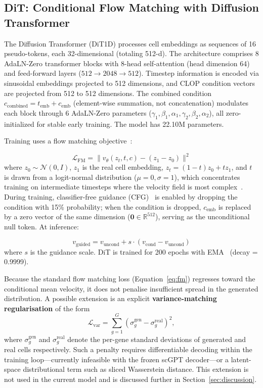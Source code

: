 \documentclass[preprint,12pt]{elsarticle}
\begin{document}
\subsection{DiT: Conditional Flow Matching with Diffusion Transformer}\label{sec:dit}

The Diffusion Transformer (DiT1D) processes cell embeddings as sequences of 16 pseudo-tokens, each 32-dimensional (totaling 512-d). The architecture comprises 8 AdaLN-Zero transformer blocks with 8-head self-attention (head dimension 64) and feed-forward layers ($512 \to 2048 \to 512$). Timestep information is encoded via sinusoidal embeddings projected to 512 dimensions, and CLOP condition vectors are projected from 512 to 512 dimensions. The combined condition $c_\text{combined} = t_\text{emb} + c_\text{emb}$ (element-wise summation, not concatenation) modulates each block through 6 AdaLN-Zero parameters ($\gamma_1, \beta_1, \alpha_1, \gamma_2, \beta_2, \alpha_2$), all zero-initialized for stable early training. The model has 22.10M parameters.

Training uses a flow matching objective~\cite{ref-flow-matching,ref-ot-cfm}:

\begin{equation}
\mathcal{L}_\text{FM} = \| v_\theta(z_t, t, c) - (z_1 - z_0) \|^2
\label{eq:fm}
\end{equation}
where $z_0 \sim \mathcal{N}(0, I)$, $z_1$ is the real cell embedding, $z_t = (1-t)z_0 + tz_1$, and $t$ is drawn from a logit-normal distribution ($\mu{=}0, \sigma{=}1$), which concentrates training on intermediate timesteps where the velocity field is most complex~\cite{ref-sd3}. During training, classifier-free guidance (CFG)~\cite{ref-cfg} is enabled by dropping the condition with 15\% probability; when the condition is dropped, $c_\text{emb}$ is replaced by a zero vector of the same dimension ($\mathbf{0} \in \mathbb{R}^{512}$), serving as the unconditional null token. At inference:

\begin{equation}
v_\text{guided} = v_\text{uncond} + s \cdot (v_\text{cond} - v_\text{uncond})
\label{eq:cfg}
\end{equation}
where $s$ is the guidance scale. DiT is trained for 200 epochs with EMA~\cite{ref-ema} (decay = 0.9999).

Because the standard flow matching loss (Equation~\ref{eq:fm}) regresses toward the conditional mean velocity, it does not penalise insufficient spread in the generated distribution. A possible extension is an explicit \textbf{variance-matching regularisation} of the form
\begin{equation}
  \mathcal{L}_\text{var} = \sum_{g=1}^{G} \left( \sigma_g^{\text{gen}} - \sigma_g^{\text{real}} \right)^2,
  \label{eq:var-loss}
\end{equation}
where $\sigma_g^{\text{gen}}$ and $\sigma_g^{\text{real}}$ denote the per-gene standard deviations of generated and real cells respectively. Such a penalty requires differentiable decoding within the training loop---currently infeasible with the frozen scGPT decoder---or a latent-space distributional term such as sliced Wasserstein distance. This extension is not used in the current model and is discussed further in Section~\ref{sec:discussion}.
\end{document}
